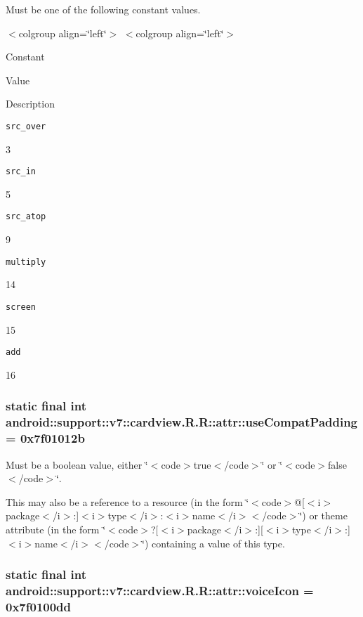 Must be one of the following constant values. \begin{TabularC}{0}
\hline
\end{TabularC}
$<$colgroup align=\char`\"{}left\char`\"{}$>$ $<$colgroup align=\char`\"{}left\char`\"{}$>$ 

Constant

Value

Description 

{\tt src\_\-over}

3

{\tt src\_\-in}

5

{\tt src\_\-atop}

9

{\tt multiply}

14

{\tt screen}

15

{\tt add}

16\hypertarget{classandroid_1_1support_1_1v7_1_1cardview_1_1_r_1_1attr_43bf2ac431b43ecc85755cbb546845c0}{
\subsubsection[{useCompatPadding}]{\setlength{\rightskip}{0pt plus 5cm}static final int android::support::v7::cardview.R.R::attr::useCompatPadding = 0x7f01012b}}
\label{classandroid_1_1support_1_1v7_1_1cardview_1_1_r_1_1attr_43bf2ac431b43ecc85755cbb546845c0}


Must be a boolean value, either \char`\"{}$<$code$>$true$<$/code$>$\char`\"{} or \char`\"{}$<$code$>$false$<$/code$>$\char`\"{}. 

This may also be a reference to a resource (in the form \char`\"{}$<$code$>$@\mbox{[}$<$i$>$package$<$/i$>$:\mbox{]}$<$i$>$type$<$/i$>$:$<$i$>$name$<$/i$>$$<$/code$>$\char`\"{}) or theme attribute (in the form \char`\"{}$<$code$>$?\mbox{[}$<$i$>$package$<$/i$>$:\mbox{]}\mbox{[}$<$i$>$type$<$/i$>$:\mbox{]}$<$i$>$name$<$/i$>$$<$/code$>$\char`\"{}) containing a value of this type. \hypertarget{classandroid_1_1support_1_1v7_1_1cardview_1_1_r_1_1attr_b4a4348704f1d36757000ac7958f0155}{
\subsubsection[{voiceIcon}]{\setlength{\rightskip}{0pt plus 5cm}static final int android::support::v7::cardview.R.R::attr::voiceIcon = 0x7f0100dd}}
\label{classandroid_1_1support_1_1v7_1_1cardview_1_1_r_1_1attr_b4a4348704f1d36757000ac7958f0155}



